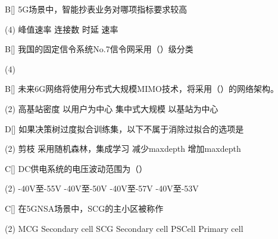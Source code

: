 \begin{choice}{B}[]
    5G场景中，智能抄表业务对哪项指标要求较高
    \begin{tasks}(4)
        \task 峰值速率
        \task 连接数
        \task 时延
        \task 速率
    \end{tasks}
\end{choice}



\begin{choice}{B}[]
    我国的固定信令系统No.7信令网采用（\quad）级分类
    \begin{tasks}(4)
    \end{tasks}
\end{choice}



\begin{choice}{B}[]
    未来6G网络将使用分布式大规模MIMO技术，将采用（\quad）的网络架构。
    \begin{tasks}(2)
        \task 高基站密度
        \task 以用户为中心
        \task 集中式大规模
        \task 以基站为中心
    \end{tasks}
\end{choice}




\begin{choice}{D}[]
    如果决策树过度拟合训练集，以下不属于消除过拟合的选项是
    \begin{tasks}(2)
        \task 剪枝
        \task 采用随机森林，集成学习
        \task 减少maxdepth
        \task 增加maxdepth
    \end{tasks}
\end{choice}

\begin{choice}{C}[]
    DC供电系统的电压波动范围为（\quad）
    \begin{tasks}(2)
        \task -40V至-55V
        \task -40V至-50V
        \task -40V至-57V
        \task -40V至-53V
    \end{tasks}
\end{choice}

\begin{choice}{C}[]
    在5GNSA场景中，SCG的主小区被称作
    \begin{tasks}(2)
        \task MCG Secondary cell
        \task SCG Secondary cell
        \task PSCell
        \task Primary cell
    \end{tasks}
\end{choice}


